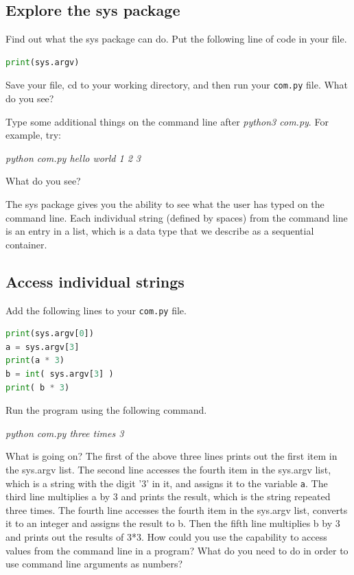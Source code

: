 \documentclass[12pt]{article}
\begin{document}
\subsection{Explore the sys package}
Find out what the sys package can do. Put the following line of code in your file.

\begin{lstlisting}[language=Python]
print(sys.argv)
\end{lstlisting} 

Save your file, cd to your working directory, and then run your \texttt{com.py} file. What do you see?

Type some additional things on the command line after \textit{python3 com.py}. For example, try:

\vspace{0.5cm}
\textit{python com.py hello world 1 2 3}
\vspace{0.5cm}

What do you see?

The sys package gives you the ability to see what the user has typed on the command line. Each individual string (defined by spaces) from the command line is an entry in a list, which is a data type that we describe as a sequential container.

\subsection{Access individual strings}
Add the following lines to your \texttt{com.py} file.
\begin{lstlisting}[language=Python]
print(sys.argv[0])
a = sys.argv[3]
print(a * 3)
b = int( sys.argv[3] )
print( b * 3)
\end{lstlisting}

Run the program using the following command.

\vspace{0.5cm}
\textit{python com.py three times 3}
\vspace{0.5cm}

What is going on? The first of the above three lines prints out the first item in the sys.argv list. The second line accesses the fourth item in the sys.argv list, which is a string with the digit '3' in it, and assigns it to the variable \texttt{a}. The third line multiplies a by 3 and prints the result, which is the string repeated three times. The fourth line accesses the fourth item in the sys.argv list, converts it to an integer and assigns the result to b. Then the fifth line multiplies b by 3 and prints out the results of 3*3.
How could you use the capability to access values from the command line in a program? What do you need to do in order to use command line arguments as numbers?
\end{document}
